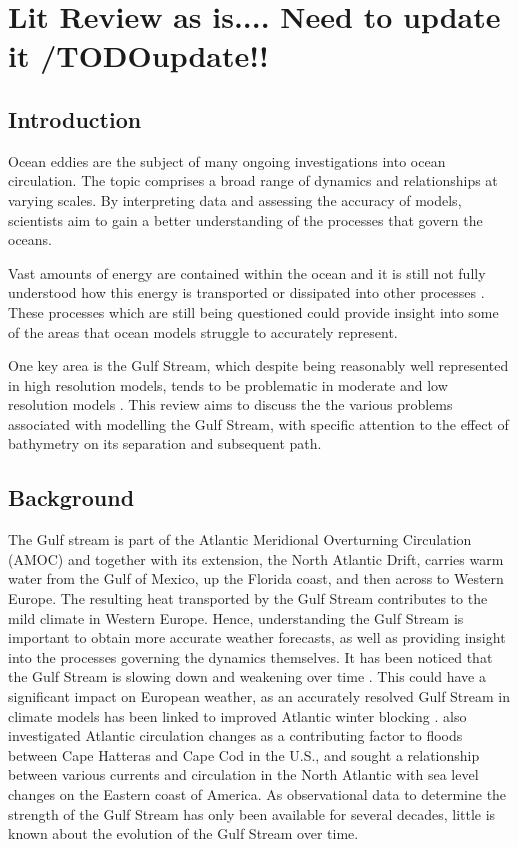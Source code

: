 \documentclass[..\EOYR.tex]{subfiles}
\begin{document}
\section{Lit Review as is.... Need to update it /TODO{update!!}}

\subsection{Introduction}
Ocean eddies are the subject of many ongoing investigations into ocean circulation. The topic comprises a broad range of dynamics and relationships at varying scales. By interpreting data and assessing the accuracy of models, scientists aim to gain a better understanding of the processes that govern the oceans.

Vast amounts of energy are contained within the ocean and it is still not fully understood how this energy is transported or dissipated into other processes \citep{Nikurashin2012a}. These processes which are still being questioned could provide insight into some of the areas that ocean models struggle to accurately represent.

One key area is the Gulf Stream, which despite being reasonably well represented in high resolution models, tends to be problematic in moderate and low resolution models \citep{Zhang2007}. This review aims to discuss the the various problems associated with modelling the Gulf Stream, with specific attention to the effect of bathymetry on its separation and subsequent path.


\subsection{Background}
The Gulf stream is part of the Atlantic Meridional Overturning Circulation (AMOC) and together with its extension, the North Atlantic Drift, carries warm water from the Gulf of Mexico, up the Florida coast, and then across to Western Europe. The resulting heat transported by the Gulf Stream contributes to the mild climate in Western Europe. Hence, understanding the Gulf Stream is important to obtain more accurate weather forecasts, as well as providing insight into the processes governing the dynamics themselves. It has been noticed that the Gulf Stream is slowing down and weakening over time \citep{Greatbatch1991}. This could have a significant impact on European weather, as an accurately resolved Gulf Stream in climate models has been linked to improved Atlantic winter blocking \citep{Scaife2011a}. \citep{Ezer2015} also investigated Atlantic circulation changes as a contributing factor to floods between Cape Hatteras and Cape Cod in the U.S., and sought a relationship between various currents and circulation in the North Atlantic with sea level changes on the Eastern coast of America. As observational data to determine the strength of the Gulf Stream has only been available for several decades, little is known about the evolution of the Gulf Stream over time. 
\end{document}
